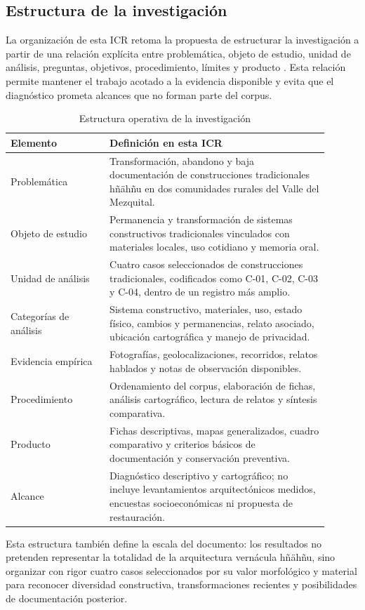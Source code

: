 \subsection{Estructura de la investigación}

La organización de esta ICR retoma la propuesta de estructurar la investigación a partir de una relación explícita entre problemática, objeto de estudio, unidad de análisis, preguntas, objetivos, procedimiento, límites y producto \citep{guerrerobaca2025propuesta}. Esta relación permite mantener el trabajo acotado a la evidencia disponible y evita que el diagnóstico prometa alcances que no forman parte del corpus.

\begin{table}[ht]
  \centering
  \caption{Estructura operativa de la investigación}
  \vspace{0.25cm}
  \label{tab:estructura_investigacion}
  \begin{tabular}{@{}L{0.28\linewidth}L{0.62\linewidth}@{}}
    \toprule
    \textbf{Elemento} & \textbf{Definición en esta ICR} \\
    \midrule
    Problemática & Transformación, abandono y baja documentación de construcciones tradicionales hñähñu en dos comunidades rurales del Valle del Mezquital. \\
    Objeto de estudio & Permanencia y transformación de sistemas constructivos tradicionales vinculados con materiales locales, uso cotidiano y memoria oral. \\
    Unidad de análisis & Cuatro casos seleccionados de construcciones tradicionales, codificados como C-01, C-02, C-03 y C-04, dentro de un registro más amplio. \\
    Categorías de análisis & Sistema constructivo, materiales, uso, estado físico, cambios y permanencias, relato asociado, ubicación cartográfica y manejo de privacidad. \\
    Evidencia empírica & Fotografías, geolocalizaciones, recorridos, relatos hablados y notas de observación disponibles. \\
    Procedimiento & Ordenamiento del corpus, elaboración de fichas, análisis cartográfico, lectura de relatos y síntesis comparativa. \\
    Producto & Fichas descriptivas, mapas generalizados, cuadro comparativo y criterios básicos de documentación y conservación preventiva. \\
    Alcance & Diagnóstico descriptivo y cartográfico; no incluye levantamientos arquitectónicos medidos, encuestas socioeconómicas ni propuesta de restauración. \\
    \bottomrule
  \end{tabular}
\end{table}

Esta estructura también define la escala del documento: los resultados no pretenden representar la totalidad de la arquitectura vernácula hñähñu, sino organizar con rigor cuatro casos seleccionados por su valor morfológico y material para reconocer diversidad constructiva, transformaciones recientes y posibilidades de documentación posterior.
